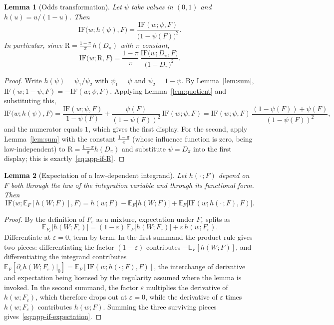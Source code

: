 \documentclass[11pt]{article}
\theoremstyle{plain}
\newtheorem{lem}{Lemma}
\theoremstyle{definition}
\theoremstyle{remark}
\newcommand{\pE}{\ensuremath{\mathbb{E}}}
\newcommand{\ratio}{\ensuremath{\pi}}
\newcommand{\contrast}{D_{\ratio}}
\newcommand{\DensityRatio}{\text{R}}
\newcommand{\IF}{\mathrm{IF}}
\begin{document}
\begin{lem}[Odds transformation]
\label{lem:odds}
Let $\psi$ take values in $(0,1)$ and $h(u) = u/(1-u)$. Then
\[
\IF\big(w;h(\psi),F\big) = \frac{\IF(w;\psi,F)}{\big(1-\psi(F)\big)^2} .
\]
In particular, since $\DensityRatio = \frac{1-\ratio}{\ratio}\, h(\contrast)$ with $\ratio$
constant,
\begin{equation}
\IF\big(w;\DensityRatio,F\big)
= \frac{1-\ratio}{\ratio}\,
\frac{\IF\big(w;\contrast,F\big)}{\big(1-\contrast\big)^{2}} .
\label{eq:app-if-R}
\end{equation}
\end{lem}
\begin{proof}
Write $h(\psi) = \psi_1/\psi_2$ with $\psi_1 = \psi$ and $\psi_2 = 1-\psi$. By
Lemma~\ref{lem:sum}, $\IF(w;1-\psi,F) = -\IF(w;\psi,F)$. Applying Lemma~\ref{lem:quotient} and
substituting this,
\[
\IF\big(w;h(\psi),F\big)
= \frac{\IF(w;\psi,F)}{1-\psi(F)}
+ \frac{\psi(F)}{(1-\psi(F))^2}\,\IF(w;\psi,F)
= \IF(w;\psi,F)\,\frac{(1-\psi(F)) + \psi(F)}{(1-\psi(F))^2},
\]
and the numerator equals $1$, which gives the first display. For the second, apply
Lemma~\ref{lem:sum} with the constant $\frac{1-\ratio}{\ratio}$ (whose influence function is
zero, being law-independent) to $\DensityRatio = \frac{1-\ratio}{\ratio} h(\contrast)$ and
substitute $\psi = \contrast$ into the first display; this is exactly~\eqref{eq:app-if-R}.
\end{proof}

\begin{lem}[Expectation of a law-dependent integrand]
\label{lem:if-expectation}
Let $h(\cdot\,;F)$ depend on $F$ both through the law of the integration variable and through
its functional form. Then
\begin{equation}
\IF\big(w; \pE_F[h(W;F)], F\big)
= h(w;F) - \pE_F\big[h(W;F)\big]
+ \pE_F\big[ \IF(w;h(\cdot\,;F),F) \big].
\label{eq:app-if-expectation}
\end{equation}
\end{lem}
\begin{proof}
By the definition of $F_\varepsilon$ as a mixture, expectation under $F_\varepsilon$ splits as
\[
\pE_{F_\varepsilon}\big[h(W;F_\varepsilon)\big]
= (1-\varepsilon)\,\pE_F\big[h(W;F_\varepsilon)\big]
+ \varepsilon\,h(w;F_\varepsilon).
\]
Differentiate at $\varepsilon = 0$, term by term. In the first summand the product rule gives
two pieces: differentiating the factor $(1-\varepsilon)$ contributes $-\pE_F[h(W;F)]$, and
differentiating the integrand contributes
$\pE_F[\partial_\varepsilon h(W;F_\varepsilon)|_{0}] = \pE_F[\IF(w;h(\cdot\,;F),F)]$, the
interchange of derivative and expectation being licensed by the regularity assumed where the
lemma is invoked. In the second summand, the factor $\varepsilon$ multiplies the derivative of
$h(w;F_\varepsilon)$, which therefore drops out at $\varepsilon = 0$, while the derivative of
$\varepsilon$ times $h(w;F_\varepsilon)$ contributes $h(w;F)$. Summing the three surviving
pieces gives~\eqref{eq:app-if-expectation}.
\end{proof}
\end{document}
